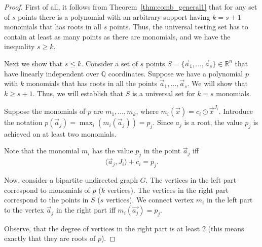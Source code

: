 \documentclass[11pt]{article}
\newcommand{\tp}{\odot}
\newcommand{\bb}[1]{\mathbb{#1}}
\begin{document}
\begin{proof}
First of all, it follows from Theorem~\ref{thm:comb_general1} that for any set of $s$ points there is a polynomial with an arbitrary support having $k=s+1$ monomials that has roots in all $s$ points. Thus, the universal testing set has to contain at least as many points as there are monomials, and we have the inequality $s \geq k$.

Next we show that $s \leq k$. 
Consider a set of $s$ points $S = \{\vec{a}_1,\ldots, \vec{a}_s\} \in \bb{R}^n$ that have linearly independent over $\bb{Q}$ coordinates. Suppose we have a polynomial $p$ with $k$ monomials that has roots in all the points $\vec{a}_1,\ldots, \vec{a}_s$. We will show that $k \geq s+1$. Thus, we will establish that $S$ is a universal set for $k=s$ monomials.

Suppose the monomials of $p$ are $m_1,\ldots, m_k$, where $m_i(\vec{x})= c_i \tp \vec{x}^{J_i}$. Introduce the notation $p(\vec{a}_j) = \max_{i} (m_{i}(\vec{a}_j)) = p_j$. Since $a_j$ is a root, the value $p_j$ is achieved on at least two monomials.

Note that the monomial $m_i$ has the value $p_j$ in the point $\vec{a}_j$ iff 
$$
\langle\vec{a}_j, J_i\rangle + c_i = p_j.
$$

Now, consider a bipartite undirected graph $G$. The vertices in the left part correspond to monomials of $p$ ($k$ vertices). The vertices in the right part correspond to the points in $S$ ($s$ vertices). We connect vertex $m_i$ in the left part to the vertex $\vec{a}_j$ in the right part iff $m_i(\vec{a_j}) = p_j$.

Observe, that the degree of vertices in the right part is at least 2 (this means exactly that they are roots of $p$). 


\end{proof}
\end{document}

